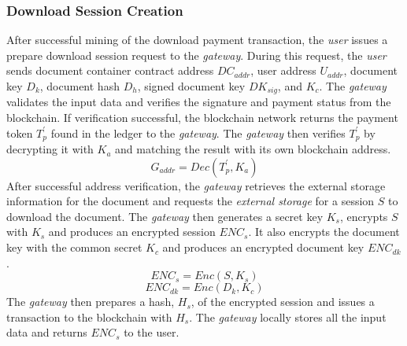 \documentclass[conference]{IEEEtran}
\begin{document}
\subsubsection{Download Session Creation}
After successful mining of the download payment transaction, the {\it user} issues a prepare download session request to the {\it gateway}. During this request, the {\it user} sends document container contract address $DC_{addr}$, user address $U_{addr}$, document key $D_k$, document hash $D_h$, signed document key $DK_{sig}$, and $K_c$. The {\it gateway} validates the input data and verifies the signature and payment status from the blockchain. If verification successful, the blockchain network returns the payment token $T_p^\prime$ found in the ledger to the {\it gateway}. The {\it gateway} then verifies $T_p^\prime$ by decrypting it with $K_a$ and matching the result with its own blockchain address. 
\begin{equation}
\label{eq-d-3}
G_{addr} = Dec (T_p^\prime, K_a)
\end{equation}
After successful address verification, the {\it gateway} retrieves the external storage information for the document and requests the {\it external storage} for a session $S$ to download the document. The {\it gateway} then generates a secret key $K_s$,  encrypts $S$ with $K_s$ and produces an encrypted session $ENC_s$. It also encrypts the document key with the common secret $K_c$ and produces an encrypted document key $ENC_{dk}$. 
\begin{equation}
\label{eq-d-4} 
ENC_s = Enc (S, K_s)
\end{equation}
\begin{equation}
\label{eq-d-5} 
ENC_{dk} = Enc (D_k, K_c)
\end{equation}
The {\it gateway} then prepares a hash, $H_s$, of the encrypted session and issues a transaction to the blockchain with $H_s$. The {\it gateway} locally stores all the input data and returns $ENC_s$ to the user.
\end{document}
